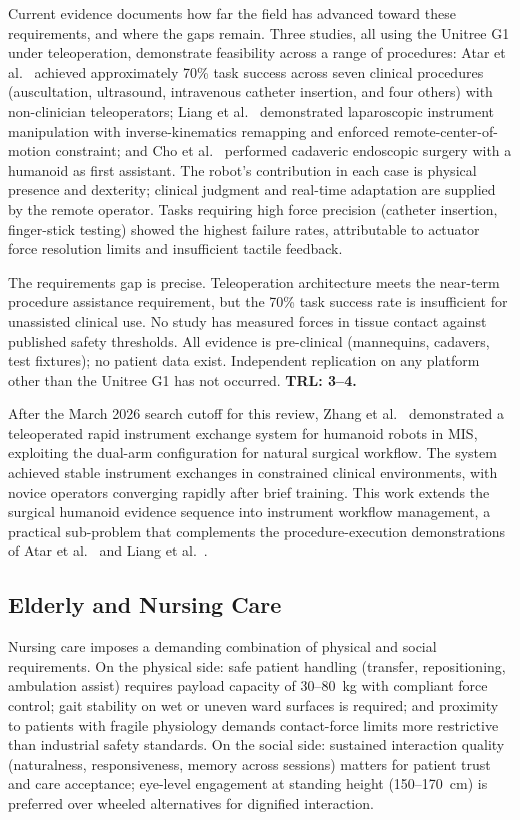 \documentclass[acmjour]{acmart}
\begin{document}
Current evidence documents how far the field has advanced toward these
requirements, and where the gaps remain. Three studies, all using the Unitree
G1 under teleoperation, demonstrate feasibility across a range of procedures:
Atar et al.~\cite{atar2025humanoids} achieved approximately 70\% task success
across seven clinical procedures (auscultation, ultrasound, intravenous
catheter insertion, and four others) with non-clinician teleoperators; Liang et
al.~\cite{liang2025lapsurgie} demonstrated laparoscopic instrument manipulation
with inverse-kinematics remapping and enforced remote-center-of-motion
constraint; and Cho et al.~\cite{cho2026humanoid} performed cadaveric
endoscopic surgery with a humanoid as first assistant. The robot's contribution
in each case is physical presence and dexterity; clinical judgment and
real-time adaptation are supplied by the remote operator. Tasks requiring high
force precision (catheter insertion, finger-stick testing) showed the highest
failure rates, attributable to actuator force resolution limits and insufficient
tactile feedback.

The requirements gap is precise. Teleoperation architecture meets the
near-term procedure assistance requirement, but the 70\% task success rate is
insufficient for unassisted clinical use. No study has measured forces in
tissue contact against published safety thresholds. All evidence is pre-clinical
(mannequins, cadavers, test fixtures); no patient data exist. Independent
replication on any platform other than the Unitree G1 has not occurred.
\textbf{TRL: 3--4.}

After the March 2026 search cutoff for this review, Zhang et
al.~\cite{zhang2026rapid} demonstrated a teleoperated rapid instrument exchange
system for humanoid robots in MIS, exploiting the dual-arm configuration for
natural surgical workflow. The system achieved stable instrument exchanges in
constrained clinical environments, with novice operators converging rapidly after
brief training. This work extends the surgical humanoid evidence sequence into
instrument workflow management, a practical sub-problem that complements the
procedure-execution demonstrations of Atar et al.~\cite{atar2025humanoids} and
Liang et al.~\cite{liang2025lapsurgie}.

\subsection{Elderly and Nursing Care}
\label{sec:eldercare}

Nursing care imposes a demanding combination of physical and social requirements.
On the physical side: safe patient handling (transfer, repositioning, ambulation
assist) requires payload capacity of 30--80~kg with compliant force control;
gait stability on wet or uneven ward surfaces is required; and proximity to
patients with fragile physiology demands contact-force limits more restrictive
than industrial safety standards. On the social side: sustained interaction
quality (naturalness, responsiveness, memory across sessions) matters for
patient trust and care acceptance; eye-level engagement at standing height
(150--170~cm) is preferred over wheeled alternatives for dignified interaction.
\end{document}
